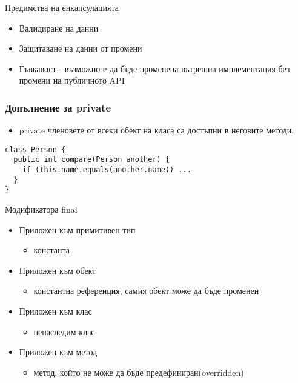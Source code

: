 \documentclass{beamer}
\begin{document}
\begin{frame}{Предимства на енкапсулацията}
  \transdissolve
  \begin{itemize}
  \item Валидиране на данни \pause
  \item Защитаване на данни от промени \pause
  \item Гъвкавост - възможно е да бъде
    променена вътрешна имплементация
    без промени на публичното API
  \end{itemize}
\end{frame}

\begin{frame}[fragile]
  \frametitle{Допълнение за private}
  \transdissolve
  \begin{itemize}
  \item private членовете от всеки обект на
    класа са достъпни в неговите методи.
  \end{itemize}
\begin{lstlisting}
class Person {
  public int compare(Person another) {
    if (this.name.equals(another.name)) ...
  }
}
\end{lstlisting}
\end{frame}

\begin{frame}{Модификатора final}
  \transdissolve
  \begin{itemize}
  \item Приложен към примитивен тип
    \begin{itemize}
      \item константа \pause
    \end{itemize}
  \item Приложен към обект
    \begin{itemize}
    \item константна референция, самия обект
      може да бъде променен \pause
    \end{itemize}
  \item Приложен към клас
    \begin{itemize}
    \item ненаследим клас \pause
    \end{itemize}
  \item Приложен към метод
    \begin{itemize}
    \item метод, който не
      може да бъде предефиниран(overridden)
    \end{itemize}

  \end{itemize}
\end{frame}
\end{document}
